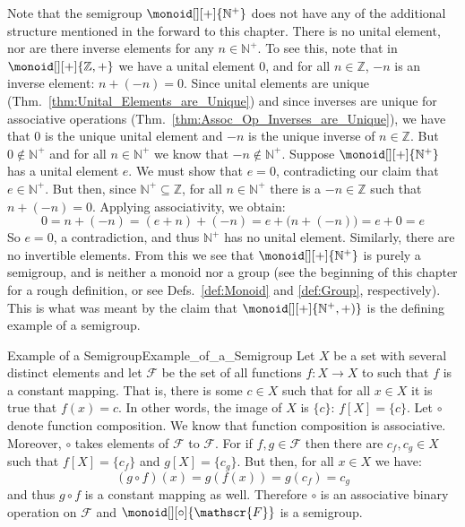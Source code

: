     Note that the semigroup $\monoid[][+]{\mathbb{N}^{+}}$ does not have any of
    the additional structure mentioned in the forward to this chapter. There is
    no unital element, nor are there inverse elements for any
    $n\in\mathbb{N}^{+}$. To see this, note that in $\monoid[][+]{\mathbb{Z},+}$
    we have a unital element 0, and for all $n\in\mathbb{Z}$, $\minus{n}$ is an
    inverse element: $n+(\minus{n})=0$. Since unital elements are unique
    (Thm.~\ref{thm:Unital_Elements_are_Unique}) and since inverses are unique
    for associative operations (Thm.~\ref{thm:Assoc_Op_Inverses_are_Unique}), we
    have that 0 is the unique unital element and $\minus{n}$ is the unique
    inverse of $n\in\mathbb{Z}$. But $0\notin\mathbb{N}^{+}$ and for all
    $n\in\mathbb{N}^{+}$ we know that $\minus{n}\notin\mathbb{N}^{+}$.
    Suppose $\monoid[][+]{\mathbb{N}^{+}}$ has a unital element $e$. We must
    show that $e=0$, contradicting our claim that $e\in\mathbb{N}^{+}$. But
    then, since $\mathbb{N}^{+}\subseteq\mathbb{Z}$, for all
    $n\in\mathbb{N}^{+}$ there is a $\minus{n}\in\mathbb{Z}$ such that
    $n+(\minus{n})=0$. Applying associativity, we obtain:
    \begin{equation}
        0=n+(\minus{n})=(e+n)+(\minus{n})=e+\big(n+(\minus{n})\big)=e+0=e
    \end{equation}
    So $e=0$, a contradiction, and thus $\mathbb{N}^{+}$ has no unital
    element. Similarly, there are no invertible elements. From this we see that
    $\monoid[][+]{\mathbb{N}^{+}}$ is purely a semigroup, and is neither a monoid
    nor a group (see the beginning of this chapter for a rough definition, or
    see Defs.~\ref{def:Monoid} and \ref{def:Group}, respectively). This is what
    was meant by the claim that $\monoid[][+]{\mathbb{N}^{+},+)}$ is the
    defining example of a semigroup.
    \begin{fexample}{Example of a Semigroup}{Example_of_a_Semigroup}
        Let $X$ be a set with several distinct elements and let $\mathscr{F}$ be
        the set of all functions $f:X\rightarrow{X}$ to such that $f$ is a
        constant mapping. That is, there is some $c\in{X}$ such that for all
        $x\in{X}$ it is true that $f(x)=c$. In other words, the image of $X$ is
        $\{c\}$: $f[X]=\{c\}$. Let $\circ$ denote function composition. We know
        that function composition is associative. Moreover, $\circ$ takes
        elements of $\mathscr{F}$ to $\mathscr{F}$. For if $f,g\in\mathscr{F}$
        then there are $c_{f},c_{g}\in{X}$ such that $f[X]=\{c_{f}\}$ and
        $g[X]=\{c_{g}\}$. But then, for all $x\in{X}$ we have:
        \begin{equation}
            (g\circ{f})(x)=g(f(x))=g(c_{f})=c_{g}
        \end{equation}
        and thus $g\circ{f}$ is a constant mapping as well. Therefore $\circ$ is
        an associative binary operation on $\mathscr{F}$ and
        $\monoid[][\circ]{\mathscr{F}}$ is a semigroup.
    \end{fexample}
